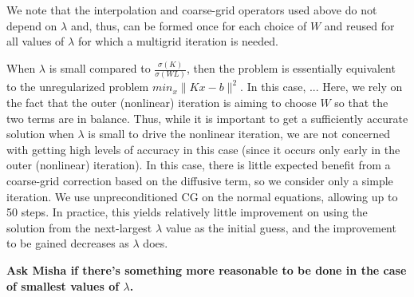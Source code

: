 We note that the interpolation and coarse-grid operators used above do
not depend on $\lambda$ and, thus, can be formed once for each choice
of $W$ and reused for all values of $\lambda$ for which a multigrid
iteration is needed.

When $\lambda$ is small compared to $\frac{\sigma(K)}{\sigma(WL)}$,
then the problem is essentially equivalent to the unregularized
problem $min_x \|Kx-b\|^2$.  In this case, ... Here, we rely on the
fact that the outer (nonlinear) iteration is aiming to choose $W$ so
that the two terms are in balance.  Thus, while it is important to get
a sufficiently accurate solution when $\lambda$ is small to drive the
nonlinear iteration, we are not concerned with getting high levels of
accuracy in this case (since it occurs only early in the outer
(nonlinear) iteration).  In this case, there is little expected
benefit from a coarse-grid correction based on the diffusive term, so
we consider only a simple iteration.  We use unpreconditioned CG on
the normal equations, allowing up to 50 steps.  In practice, this
yields relatively little improvement on using the solution from the
next-largest $\lambda$ value as the initial guess, and the improvement
to be gained decreases as $\lambda$ does.

{\bf Ask Misha if there's something more reasonable to be done in the
  case of smallest values of $\lambda$.}
